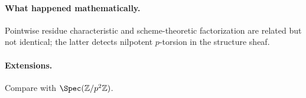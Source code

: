 \paragraph{What happened mathematically.}
Pointwise residue characteristic and scheme-theoretic factorization are related but not identical; the latter detects nilpotent $p$-torsion in the structure sheaf.

\paragraph{Extensions.}
Compare with $\Spec(\mathbb Z/p^2\mathbb Z)$.
\fi
